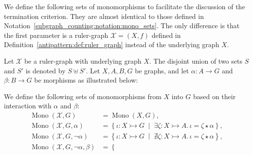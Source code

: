 
We define the following sets of monomorphisms to facilitate the discussion of the termination criterion. They are almost identical to those defined in Notation~\ref{subgraph_counting:notation:mono_sets}. The only difference is that the first parameter is a ruler-graph $\mathcal{X}=(X,f)$ defined in Definition~\ref{antipattern:def:ruler_graph} instead of the underlying graph $X$.
\begin{notation}
    \label{antipattern:notation:mono_sets}
  Let \( \mathcal{X}\) be a ruler-graph with underlying graph $X$. The disjoint union of two sets \( S \) and \( S' \) is denoted by \( S \uplus S' \). Let \( X, A, B, G \) be graphs, and let \( \alpha \mathop{\colon} A \mathop{\to} G \) and \( \beta \mathop{\colon} B \mathop{\to} G \) be morphisms as illustrated below:
  \begin{center}
    \end{center}
     We define the following sets of monomorphisms from $X$ into $G$ based on their interaction with $\alpha$ and $\beta$:    
    \begin{align*}
        \operatorname{Mono}(\mathcal{X},G) &= \operatorname{Mono}(X,G), 
        \\
        \operatorname{Mono}(\mathcal{X},G,\alpha) &= \left\{ \iota \mathop{\colon} X \rightarrowtail G 
        \;\middle|\; 
        \exists \zeta \mathop{\colon} X \rightarrowtail A.\, \iota \mathop{=} \zeta \mathop{\star} \alpha \right\}, 
        \\
        \operatorname{Mono}(\mathcal{X},G,\mathop{\lnot} \alpha) &= \left\{ \iota \mathop{\colon} X \rightarrowtail G 
        \;\middle|\; 
        \nexists \zeta \mathop{\colon} X \rightarrowtail A.\, \iota \mathop{=} \zeta \mathop{\star} \alpha \right\}, 
        \\
        \operatorname{Mono}(\mathcal{X},G,\mathop{\lnot} \alpha, \beta) &= \left\{ 

\end{align*}
\end{notation}
